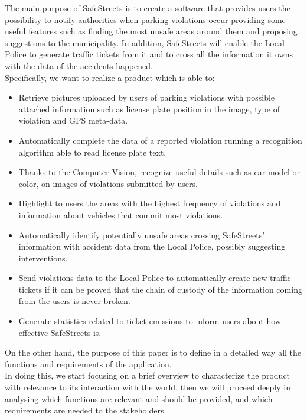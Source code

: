The main purpose of SafeStreets is to create a software that provides users the possibility to notify	
authorities	when parking violations occur providing some useful features such as finding the most unsafe areas around them and proposing suggestions to the municipality. In addition, SafeStreets will enable the Local Police to generate traffic tickets from it and to cross all the information it owns with the data of the accidents happened.\\
Specifically, we want to realize a product which is able to:
\begin{itemize}
	
	\item Retrieve pictures uploaded by users of parking violations with possible attached information such as license plate position in the image, type of violation and GPS meta-data.
	
	\item Automatically complete the data of a reported violation running a recognition algorithm able to read license plate text.
	
	\item Thanks to the Computer Vision, recognize useful details such as car model or color, on images of violations submitted by users.
	
	\item Highlight to users the areas with the highest frequency of violations and information about vehicles that commit most violations.
	
	\item Automatically identify potentially unsafe	areas crossing SafeStreets' information with accident data from the Local Police, possibly suggesting interventions.
	
	\item Send violations data to the Local Police to automatically create new traffic tickets if it can be proved that the	chain	of	custody	of	the	information	coming	from	the	users	is	never	broken.
	
	\item Generate statistics related to ticket emissions to inform users about how effective SafeStreets is.
	
\end{itemize}

On the other hand, the purpose of this paper is to define in a detailed way all the functions and requirements of the application.\\ In doing this, we start focusing on a brief overview to characterize the product with relevance to its interaction with the world, then we will proceed deeply in analysing which functions are relevant and should be provided, and which requirements are needed to the stakeholders. 

